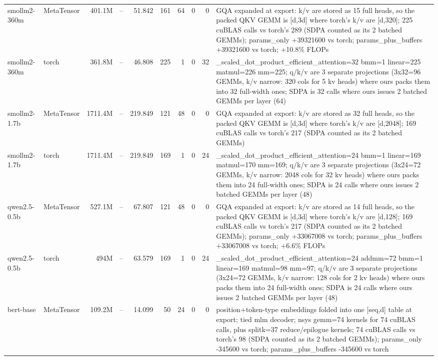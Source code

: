 \begin{tabular}{llrrrrrrrp{}}
smollm2-360m & MetaTensor & 401.1M & -- & 51.842 & 161 & 64 & 0 & 0 & GQA expanded at export: k/v are stored as 15 full heads, so the packed QKV GEMM is [d,3d] where torch's k/v are [d,320]; 225 cuBLAS calls vs torch's 289 (SDPA counted as its 2 batched GEMMs); params\_only +39321600 vs torch; params\_plus\_buffers +39321600 vs torch; +10.8\% FLOPs \\
smollm2-360m & torch & 361.8M & -- & 46.808 & 225 & 1 & 0 & 32 & \_scaled\_dot\_product\_efficient\_attention=32 bmm=1 linear=225 matmul=226 mm=225; q/k/v are 3 separate projections (3x32=96 GEMMs, k/v narrow: 320 cols for 5 kv heads) where ours packs them into 32 full-width ones; SDPA is 32 calls where ours issues 2 batched GEMMs per layer (64) \\
smollm2-1.7b & MetaTensor & 1711.4M & -- & 219.849 & 121 & 48 & 0 & 0 & GQA expanded at export: k/v are stored as 32 full heads, so the packed QKV GEMM is [d,3d] where torch's k/v are [d,2048]; 169 cuBLAS calls vs torch's 217 (SDPA counted as its 2 batched GEMMs) \\
smollm2-1.7b & torch & 1711.4M & -- & 219.849 & 169 & 1 & 0 & 24 & \_scaled\_dot\_product\_efficient\_attention=24 bmm=1 linear=169 matmul=170 mm=169; q/k/v are 3 separate projections (3x24=72 GEMMs, k/v narrow: 2048 cols for 32 kv heads) where ours packs them into 24 full-width ones; SDPA is 24 calls where ours issues 2 batched GEMMs per layer (48) \\
qwen2.5-0.5b & MetaTensor & 527.1M & -- & 67.807 & 121 & 48 & 0 & 0 & GQA expanded at export: k/v are stored as 14 full heads, so the packed QKV GEMM is [d,3d] where torch's k/v are [d,128]; 169 cuBLAS calls vs torch's 217 (SDPA counted as its 2 batched GEMMs); params\_only +33067008 vs torch; params\_plus\_buffers +33067008 vs torch; +6.6\% FLOPs \\
qwen2.5-0.5b & torch & 494M & -- & 63.579 & 169 & 1 & 0 & 24 & \_scaled\_dot\_product\_efficient\_attention=24 addmm=72 bmm=1 linear=169 matmul=98 mm=97; q/k/v are 3 separate projections (3x24=72 GEMMs, k/v narrow: 128 cols for 2 kv heads) where ours packs them into 24 full-width ones; SDPA is 24 calls where ours issues 2 batched GEMMs per layer (48) \\
bert-base & MetaTensor & 109.2M & -- & 14.099 & 50 & 24 & 0 & 0 & position+token-type embeddings folded into one [seq,d] table at export; tied mlm decoder; nsys gemm=74 kernels for 74 cuBLAS calls, plus splitk=37 reduce/epilogue kernels; 74 cuBLAS calls vs torch's 98 (SDPA counted as its 2 batched GEMMs); params\_only -345600 vs torch; params\_plus\_buffers -345600 vs torch \\

\end{tabular}
